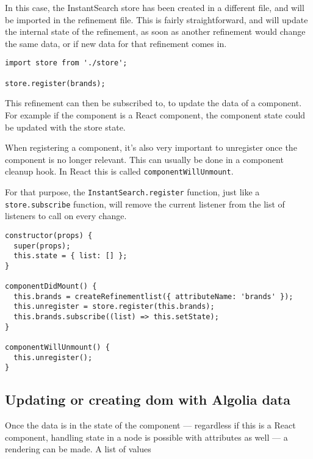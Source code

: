 In this case, the InstantSearch store has been created in a different file, and will be imported in the refinement file. This is fairly straightforward, and will update the internal state of the refinement, as soon as another refinement would change the same data, or if new data for that refinement comes in. 

\begin{minipage}{\linewidth}
\begin{lstlisting}[caption={Registering a refinement},label={lst:registering-refinement}]
import store from './store';

store.register(brands);
\end{lstlisting}
\end{minipage}

This refinement can then be subscribed to, to update the data of a component. For example if the component is a React component, the component state could be updated with the store state. 

When registering a component, it's also very important to unregister once the component is no longer relevant. This can usually be done in a component cleanup hook. In React this is called {\tt componentWillUnmount}.

For that purpose, the {\tt InstantSearch.register} function, just like a {\tt store.subscribe} function, will remove the current listener from the list of listeners to call on every change.

\begin{minipage}{\linewidth}
\begin{lstlisting}[caption={InstantSearch Core inside a React component},label={lst:core-react}]
constructor(props) {
  super(props);
  this.state = { list: [] };
}

componentDidMount() {
  this.brands = createRefinementlist({ attributeName: 'brands' });
  this.unregister = store.register(this.brands);
  this.brands.subscribe((list) => this.setState);
}

componentWillUnmount() {
  this.unregister();
}
\end{lstlisting}
\end{minipage}

\subsection{Updating or creating \acrshort{dom} with Algolia data}
\label{subs:data_to_dom}

Once the data is in the state of the component --- regardless if this is a React component, handling state in a node is possible with attributes as well --- a rendering can be made. A list of values 

